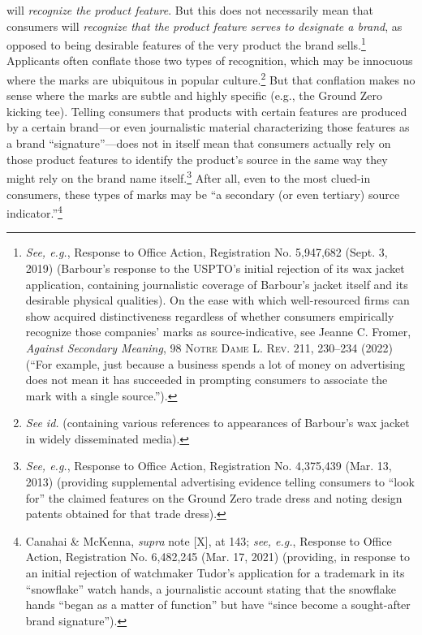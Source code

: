 \documentclass[letterpaper, 11pt, oneside]{article}
\begin{document}
will \textit{recognize the product feature}. But this does not necessarily mean that consumers will \textit{recognize that the product feature serves to designate a brand}, as opposed to being desirable features of the very product the brand sells.\footnote{\textit{See, e.g.}, Response to Office Action, Registration No. 5,947,682 (Sept. 3, 2019) (Barbour's response to the USPTO's initial rejection of its wax jacket application, containing journalistic coverage of Barbour's jacket itself and its desirable physical qualities). On the ease with which well-resourced firms can show acquired distinctiveness regardless of whether consumers empirically recognize those companies' marks as source-indicative, see Jeanne C. Fromer, \textit{Against Secondary Meaning}, 98 \textsc{Notre Dame L. Rev.} 211, 230–234 (2022) (``For example, just because a business spends a lot of money on advertising does not mean it has succeeded in prompting consumers to associate the mark with a single source.'').} Applicants often conflate those two types of recognition, which may be innocuous where the marks are ubiquitous in popular culture.\footnote{\textit{See id.} (containing various references to appearances of Barbour's wax jacket in widely disseminated media).} But that conflation makes no sense where the marks are subtle and highly specific (e.g., the Ground Zero kicking tee). Telling consumers that products with certain features are produced by a certain brand—or even journalistic material characterizing those features as a brand ``signature''—does not in itself mean that consumers actually rely on those product features to identify the product's source in the same way they might rely on the brand name itself.\footnote{\textit{See, e.g.}, Response to Office Action, Registration No. 4,375,439 (Mar. 13, 2013) (providing supplemental advertising evidence telling consumers to ``look for'' the claimed features on the Ground Zero trade dress and noting design patents obtained for that trade dress).} After all, even to the most clued-in consumers, these types of marks may be ``a secondary (or even tertiary) source indicator.''\footnote{Canahai \& McKenna, \textit{supra} note [X], at 143; \textit{see, e.g.}, Response to Office Action, Registration No. 6,482,245 (Mar. 17, 2021) (providing, in response to an initial rejection of watchmaker Tudor's application for a trademark in its ``snowflake'' watch hands, a journalistic account stating that the snowflake hands ``began as a matter of function'' but have ``since become a sought-after brand signature'').}
\end{document}
